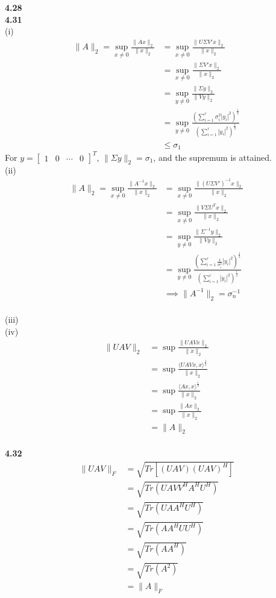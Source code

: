 \documentclass[letterpaper,12pt]{article}
\theoremstyle{definition}
\begin{document}
\noindent\textbf{4.28}\\

\noindent\textbf{4.31}\\
(i) \begin{align*}
\|A\|_2 = \sup_{x \ne 0} \frac{\|Ax\|_2}{\|x\|_2} &= \sup_{x \ne 0} \frac{\|U \Sigma V' x\|_2}{\|x\|_2}\\
&= \sup_{x \ne 0} \frac{\| \Sigma V' x\|_2}{\|x\|_2}\\
&= \sup_{y \ne 0} \frac{\|\Sigma y\|_2}{\|Vy\|_2}\\
&= \sup_{y \ne 0} \frac{(\sum_{i=1}^{r} \sigma_i^2 |y_i|^2)^{\frac{1}{2}}}{(\sum_{i=1}^{r} |y_i|^2)^\frac{1}{2}}\\
& \leq \sigma_1
\end{align*}
For $y=\begin{bmatrix}  1 & 0 & \cdots & 0 \end{bmatrix}^T$, $\|\Sigma y\|_2 = \sigma_1$, and the supremum is attained.\\

\noindent (ii) \begin{align*}
\|A\|_2 = \sup_{x \ne 0} \frac{\|A^{-1}x\|_2}{\|x\|_2} &= \sup_{x \ne 0} \frac{\|(U \Sigma V')^{-1} x\|_2}{\|x\|_2}\\
&= \sup_{x \ne 0} \frac{\|V \Sigma U^T x\|_2}{\|x\|_2}\\
&= \sup_{y \ne 0} \frac{\|\Sigma^{-1} y\|_2}{\|Vy\|_2}\\
&= \sup_{y \ne 0} \frac{(\sum_{i=1}^{r} \frac{1}{\sigma_i^2} |y_i|^2)^{\frac{1}{2}}}{(\sum_{i=1}^{r} |y_i|^2)^\frac{1}{2}}\\
&\implies \|A^{-1}\|_2 = \sigma_n^{-1}
\end{align*}\\

\noindent (iii) \\

\noindent (iv) \begin{align*}
\|UAV\|_2 &= \sup \frac{\|UAVx\|_2}{\|x\|_2}\\
&= \sup \frac{\langle UAVx, x \rangle ^\frac{1}{2}}{\|x\|_2}\\
&= \sup \frac{\langle Ax, x \rangle ^\frac{1}{2}}{\|x\|_2}\\
&= \sup \frac{\|Ax\|_2}{\|x\|_2}\\
&= \|A\|_2
\end{align*}\\

\noindent\textbf{4.32}\\
\begin{align*}
\|UAV\|_F &= \sqrt{Tr[(UAV)(UAV)^H]}\\
&= \sqrt{Tr(UAVV^HA^HU^H)}\\
&= \sqrt{Tr(UAA^HU^H)}\\
&= \sqrt{Tr(AA^HUU^H)}\\
&= \sqrt{Tr(AA^H)}\\
&= \sqrt{Tr(A^2)}\\
&= \|A\|_F
\end{align*}\\
\end{document}
